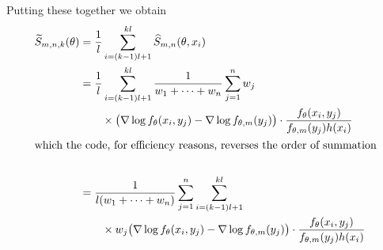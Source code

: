 \documentclass{article}
\begin{document}
Putting these together we obtain
\begin{align*}
   \widetilde{S}_{m, n, k}(\theta)
   & =
   \frac{1}{l}
   \sum_{i = (k - 1) l + 1}^{k l}
   \widehat{S}_{m, n}(\theta, x_i)
   \\
   & =
   \frac{1}{l}
   \sum_{i = (k - 1) l + 1}^{k l}
   \frac{1}{w_1 + \cdots + w_n} \sum_{j = 1}^n
   w_j
   \\
   & \qquad \times
   \bigl(
   \nabla \log f_{\theta}(x_i, y_j)
   -
   \nabla \log f_{\theta, m}(y_j)
   \bigr)
   \cdot
   \frac{f_{\theta}(x_i, y_j)}
   {f_{\theta, m}(y_j) h(x_i)}
   \\
\intertext{which the code, for efficiency reasons, reverses the order of
summation}
   \\
   & =
   \frac{1}{l (w_1 + \cdots + w_n)} \sum_{j = 1}^n
   \sum_{i = (k - 1) l + 1}^{k l}
   \\
   & \qquad \times
   w_j
   \bigl(
   \nabla \log f_{\theta}(x_i, y_j)
   -
   \nabla \log f_{\theta, m}(y_j)
   \bigr)
   \cdot
   \frac{f_{\theta}(x_i, y_j)}
   {f_{\theta, m}(y_j) h(x_i)}
\end{align*}
\end{document}
